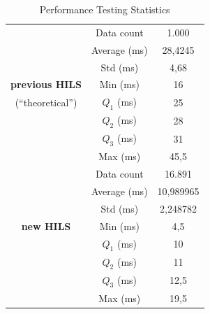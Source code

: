\begin{table}[!htbp]
	\caption{Performance Testing Statistics}
	\label{tbl-section-6-perf-result-statistics}
	\begin{center}
		\begin{tabular}{c c c}
			\toprule
			                       & Data count   & 1.000     \\
			\cline{2-3}
			                       & Average (ms) & 28,4245   \\
			\cline{2-3}
			                       & Std (ms)     & 4,68      \\
			\cline{2-3}
			\textbf{previous HILS} & Min (ms)     & 16        \\
			\cline{2-3}
			(``theoretical'')      & $Q_1$ (ms)   & 25        \\
			\cline{2-3}
			                       & $Q_2$ (ms)   & 28        \\
			\cline{2-3}
			                       & $Q_3$ (ms)   & 31        \\
			\cline{2-3}
			                       & Max (ms)     & 45,5      \\
			\midrule
			                       & Data count   & 16.891    \\
			\cline{2-3}
			                       & Average (ms) & 10,989965 \\
			\cline{2-3}
			                       & Std (ms)     & 2,248782  \\
			\cline{2-3}
			\textbf{new HILS}      & Min (ms)     & 4,5       \\
			\cline{2-3}
			                       & $Q_1$ (ms)   & 10        \\
			\cline{2-3}
			                       & $Q_2$ (ms)   & 11        \\
			\cline{2-3}
			                       & $Q_3$ (ms)   & 12,5      \\
			\cline{2-3}
			                       & Max (ms)     & 19,5      \\
			\bottomrule
		\end{tabular}
	\end{center}
\end{table}


